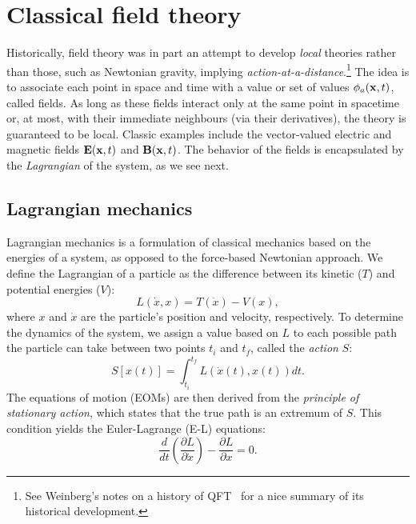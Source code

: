 
\section{Classical field theory}
\label{sec:01_qft_classical}

Historically, field theory was in part an attempt to develop \textit{local} theories rather than those, such as Newtonian gravity, implying \textit{action-at-a-distance}.\footnote{See Weinberg's notes on a history of QFT~\cite{WeinbergHistoryQFT} for a nice summary of its historical development.}
The idea is to associate each point in space and time with a value or set of values $\phi_a(\mathbf{x}, t)$, called fields.
As long as these fields interact only at the same point in spacetime or, at most, with their immediate neighbours (via their derivatives), the theory is guaranteed to be local.
Classic examples include the vector-valued electric and magnetic fields $\mathbf{E}(\mathbf{x}, t)$ and $\mathbf{B}(\mathbf{x}, t)$.
The behavior of the fields is encapsulated by the \textit{Lagrangian} of the system, as we see next.

\subsection{Lagrangian mechanics}
\label{sec:01_qft_classical_lagrangian}

Lagrangian mechanics is a formulation of classical mechanics based on the energies of a system, as opposed to the force-based Newtonian approach.
We define the Lagrangian of a particle as the difference between its kinetic ($T$) and potential energies ($V$):
\begin{equation}
	\label{eq:01_qft_classical_lagrangian}
	L(\dot x, x) = T(\dot x) - V(x),
\end{equation}
where $x$ and $\dot x$ are the particle's position and velocity, respectively.
To determine the dynamics of the system, we assign a value based on $L$ to each possible path the particle can take between two points $t_i$ and $t_f$, called the \textit{action} $S$:
\begin{equation}
	\label{eq:01_qft_classical_action}
	S[x(t)] = \int_{t_i}^{t_f} L(\dot x(t), x(t)) dt.
\end{equation}
The equations of motion (EOMs) are then derived from the \textit{principle of stationary action}, which states that the true path is an extremum of $S$.
This condition yields the Euler-Lagrange (E-L) equations:
\begin{equation}
	\label{eq:01_qft_classical_euler_lagrange}
	\frac{d}{dt}\left(\frac{\partial L}{\partial \dot x}\right) - \frac{\partial L}{\partial x} = 0.
\end{equation}

